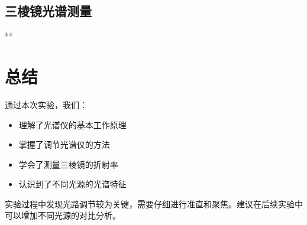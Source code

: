 \documentclass{ctexart}
\begin{document}
\subsection{三棱镜光谱测量}
**

\section{总结}

通过本次实验，我们：
\begin{itemize}
    \item 理解了光谱仪的基本工作原理
    \item 掌握了调节光谱仪的方法
    \item 学会了测量三棱镜的折射率
    \item 认识到了不同光源的光谱特征
\end{itemize}

实验过程中发现光路调节较为关键，需要仔细进行准直和聚焦。建议在后续实验中可以增加不同光源的对比分析。
\end{document}
